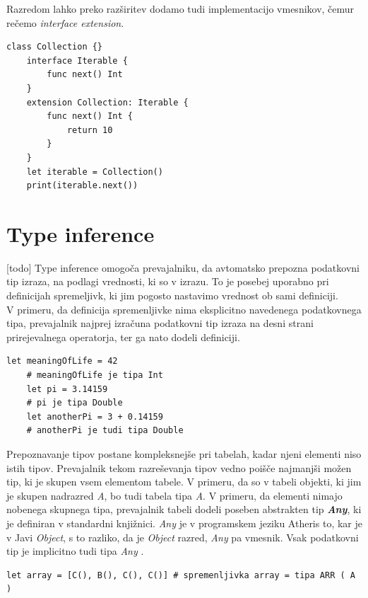 \documentclass[a4paper, 12p]{book}
\begin{document}
Razredom lahko preko razširitev dodamo tudi implementacijo vmesnikov, čemur rečemo \textit{interface extension}.

\begin{lstlisting}[caption=Razširitev z vmesnikom., captionpos=b]
	class Collection {}
	interface Iterable {
	    func next() Int
	}
	extension Collection: Iterable {
	    func next() Int {
	        return 10
	    }
	}
	let iterable = Collection()
	print(iterable.next())
\end{lstlisting}

\section{Type inference}

[todo]
Type inference omogoča prevajalniku, da avtomatsko prepozna podatkovni tip izraza, na podlagi vrednosti, ki so v izrazu. To je posebej uporabno pri definicijah spremeljivk, ki jim pogosto nastavimo vrednost ob sami definiciji. \\
\indent V primeru, da definicija spremenljivke nima eksplicitno navedenega podatkovnega tipa, prevajalnik najprej izračuna podatkovni tip izraza na desni strani prirejevalnega operatorja, ter ga nato dodeli definiciji.

\begin{lstlisting}[caption={Avtomatično prepoznavanje podatkovnih tipov.}, captionpos=b]
	let meaningOfLife = 42
	# meaningOfLife je tipa Int
	let pi = 3.14159
	# pi je tipa Double
	let anotherPi = 3 + 0.14159
	# anotherPi je tudi tipa Double
\end{lstlisting}

Prepoznavanje tipov postane kompleksnejše pri tabelah, kadar njeni elementi niso istih tipov. Prevajalnik tekom razreševanja tipov vedno poišče najmanjši možen tip, ki je skupen vsem elementom tabele. V primeru, da so v tabeli objekti, ki jim je skupen nadrazred \textit{A}, bo tudi tabela tipa \textit{A}. V primeru, da elementi nimajo nobenega skupnega tipa, prevajalnik tabeli dodeli poseben abstrakten tip \textit{\textbf{Any}}, ki je definiran v standardni knjižnici. \textit{Any} je v programskem jeziku Atheris to, kar je v Javi \textit{Object}, s to razliko, da je \textit{Object} razred, \textit{Any} pa vmesnik. Vsak podatkovni tip je implicitno tudi tipa \textit{Any} .

\begin{lstlisting}[caption={Elementi tabele s skupnim nadrazredom.}, captionpos=b]
	let array = [C(), B(), C(), C()] # spremenljivka array = tipa ARR ( A )
\end{lstlisting}
\end{document}
